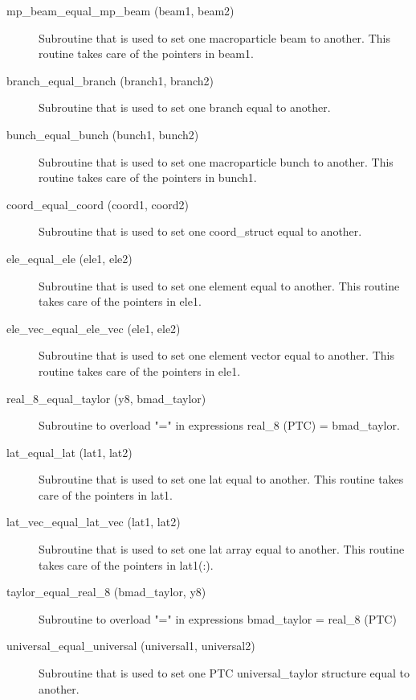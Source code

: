 \begin{description}

\item[mp_beam_equal_mp_beam (beam1, beam2)] \Newline
Subroutine that is used to set one macroparticle beam to another. This routine
takes care of the pointers in beam1.

\item[branch_equal_branch (branch1, branch2)] \Newline 
Subroutine that is used to set one branch equal to another. 

\item[bunch_equal_bunch (bunch1, bunch2)] \Newline
Subroutine that is used to set one macroparticle bunch to another. This routine
takes care of the pointers in bunch1.

\item[coord_equal_coord (coord1, coord2)] \Newline
Subroutine that is used to set one coord_struct equal to another. 

\item[ele_equal_ele (ele1, ele2)] \Newline
Subroutine that is used to set one element equal to another. 
This routine takes care of the pointers in ele1. 

\item[ele_vec_equal_ele_vec (ele1, ele2)] \Newline
Subroutine that is used to set one element vector equal to another. 
This routine takes care of the pointers in ele1. 

\item[real_8_equal_taylor (y8, bmad_taylor)] \Newline
Subroutine to overload "=" in expressions real_8 (PTC) = bmad_taylor.

\item[lat_equal_lat (lat1, lat2)] \Newline
Subroutine that is used to set one lat equal to another. 
This routine takes care of the pointers in lat1. 

\item[lat_vec_equal_lat_vec (lat1, lat2)] \Newline
Subroutine that is used to set one lat array equal to another. 
This routine takes care of the pointers in lat1(:). 

\item[taylor_equal_real_8 (bmad_taylor, y8)] \Newline
Subroutine to overload "=" in expressions bmad_taylor = real_8 (PTC) 

\item[universal_equal_universal (universal1, universal2)] \Newline
Subroutine that is used to set one PTC universal_taylor 
structure equal to another. 

\end{description}

